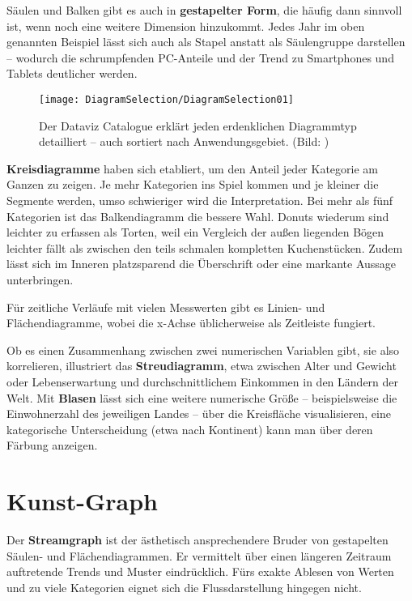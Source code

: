 Säulen und Balken gibt es auch in \textbf{gestapelter Form}, die häufig dann sinnvoll ist, wenn noch eine weitere Dimension hinzukommt. Jedes Jahr im oben genannten Beispiel lässt sich auch als Stapel anstatt als Säulengruppe darstellen -- wodurch die schrumpfenden PC-Anteile und der Trend zu Smartphones und Tablets deutlicher werden.

\begin{figure}
	\texttt{[image: DiagramSelection/DiagramSelection01]}
	\caption[Dataviz Catalogue]{Der Dataviz Catalogue erklärt jeden erdenklichen Diagrammtyp detailliert -- auch sortiert nach Anwendungsgebiet.
		(Bild: )}
\end{figure}

\textbf{Kreisdiagramme} haben sich etabliert, um den Anteil jeder Kategorie am Ganzen zu zeigen. Je mehr Kategorien ins Spiel kommen und je kleiner die Segmente werden, umso schwieriger wird die Interpretation. Bei mehr als fünf Kategorien ist das Balkendiagramm die bessere Wahl. Donuts wiederum sind leichter zu erfassen als Torten, weil ein Vergleich der außen liegenden Bögen leichter fällt als zwischen den teils schmalen kompletten Kuchenstücken. Zudem lässt sich im Inneren platzsparend die Überschrift oder eine markante Aussage unterbringen.

Für zeitliche Verläufe mit vielen Messwerten gibt es Linien- und Flächendiagramme, wobei die x-Achse üblicherweise als Zeitleiste fungiert.

Ob es einen Zusammenhang zwischen zwei numerischen Variablen gibt, sie also korrelieren, illustriert das \textbf{Streudiagramm}, etwa zwischen Alter und Gewicht oder Lebenserwartung und durchschnittlichem Einkommen in den Ländern der Welt. Mit \textbf{Blasen} lässt sich eine weitere numerische Größe -- beispielsweise die Einwohnerzahl des jeweiligen Landes – über die Kreisfläche visualisieren, eine kategorische Unterscheidung (etwa nach Kontinent) kann man über deren Färbung anzeigen.

\section{Kunst-Graph}


Der \textbf{Streamgraph} ist der ästhetisch ansprechendere Bruder von gestapelten Säulen- und Flächendiagrammen. Er vermittelt über einen längeren Zeitraum auftretende Trends und Muster eindrücklich. Fürs exakte Ablesen von Werten und zu viele Kategorien eignet sich die Flussdarstellung hingegen nicht.
	
